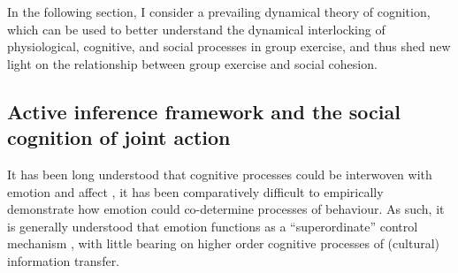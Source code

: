 \begin{CJK}{UTF8}{gbsn}
In the following section, I consider a prevailing dynamical theory of cognition, which can be used to better understand the dynamical interlocking of physiological, cognitive, and social processes in group exercise, and thus shed new light on the relationship between group exercise and social cohesion.







\subsection{Active inference framework and the social cognition of joint action}
It has been long understood that cognitive processes could be interwoven with emotion and affect \citep[cf.][]{Damasio1994}, it has been comparatively difficult to empirically demonstrate how emotion could co-determine processes of behaviour.  As such, it is generally understood that emotion functions as a ``superordinate'' control mechanism \citep{Cosmides2000}, with little bearing on higher order cognitive processes of (cultural) information transfer.


\end{CJK}
